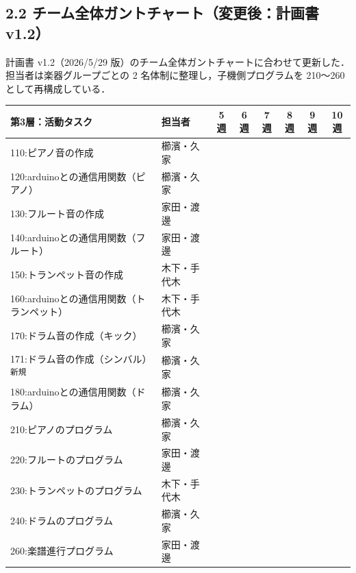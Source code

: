\documentclass[a4paper,11pt]{ltjsarticle}
\providecommand{\％}{\%}
\begin{document}
\subsection*{2.2 チーム全体ガントチャート（変更後：計画書 v1.2）}

計画書 v1.2（2026/5/29 版）のチーム全体ガントチャートに合わせて更新した．担当者は楽器グループごとの 2 名体制に整理し，子機側プログラムを 210〜260 として再構成している．

\begin{longtable}{|p{6.2cm}|p{2.3cm}|c|c|c|c|c|c|}
\hline
\rowcolor[gray]{0.9}
第3層：活動タスク & 担当者 & 5週 & 6週 & 7週 & 8週 & 9週 & 10週 \\
\hline
110:ピアノ音の作成 & 櫛濱・久家 & \cellcolor{ganttCell} & \cellcolor{ganttCell} & & & & \\
\hline
120:arduinoとの通信用関数（ピアノ） & 櫛濱・久家 & \cellcolor{ganttCell} & \cellcolor{ganttCell} & & & & \\
\hline
130:フルート音の作成 & 家田・渡邊 & \cellcolor{ganttCell} & \cellcolor{ganttCell} & & & & \\
\hline
140:arduinoとの通信用関数（フルート） & 家田・渡邊 & \cellcolor{ganttCell} & \cellcolor{ganttCell} & & & & \\
\hline
150:トランペット音の作成 & 木下・手代木 & \cellcolor{ganttCell} & \cellcolor{ganttCell} & & & & \\
\hline
160:arduinoとの通信用関数（トランペット） & 木下・手代木 & \cellcolor{ganttCell} & \cellcolor{ganttCell} & & & & \\
\hline
170:ドラム音の作成（キック） & 櫛濱・久家 & & \cellcolor{ganttCell} & & & & \\
\hline
171:ドラム音の作成（シンバル）\textsuperscript{新規} & 櫛濱・久家 & & \cellcolor{ganttCell} & & & & \\
\hline
180:arduinoとの通信用関数（ドラム） & 櫛濱・久家 & & \cellcolor{ganttCell} & & & & \\
\hline
210:ピアノのプログラム & 櫛濱・久家 & \cellcolor{ganttCell} & & & & & \\
\hline
220:フルートのプログラム & 家田・渡邊 & \cellcolor{ganttCell} & & & & & \\
\hline
230:トランペットのプログラム & 木下・手代木 & \cellcolor{ganttCell} & & & & & \\
\hline
240:ドラムのプログラム & 櫛濱・久家 & & \cellcolor{ganttCell} & & & & \\
\hline
260:楽譜進行プログラム & 家田・渡邊 & & \cellcolor{ganttCell} & \cellcolor{ganttCell} & & & \\

\end{longtable}
\end{document}
